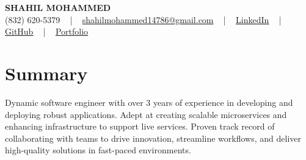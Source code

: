 \documentclass[letterpaper,10pt]{article}
\begin{document}
\begin{center}
    {\fontsize{14pt}{12pt}\selectfont \textbf{\MakeUppercase{Shahil Mohammed}}}\\ \vspace{2pt}
    \fontsize{10pt}{12pt}\selectfont (832) 620-5379 ~ | ~ \href{mailto:shahilmohammed14786@gmail.com}{shahilmohammed14786@gmail.com} ~ | ~  
    \href{https://www.linkedin.com/in/shahil-mohammed-9652931a1/}{\color{blue}\underline{LinkedIn}}  ~ | ~ 
    \href{https://github.com/freakbeast14}{\color{blue}\underline{GitHub}} ~ | ~ 
    \href{https://shahil-mohammed.netlify.app/}{\color{blue}\underline{Portfolio}}
    \vspace{-8pt}
\end{center}

\section{Summary}
\vspace{-2pt}\fontsize{8pt}{9pt}\selectfont
Dynamic software engineer with over 3 years of experience in developing and deploying robust applications. Adept at creating scalable microservices and enhancing infrastructure to support live services. Proven track record of collaborating with teams to drive innovation, streamline workflows, and deliver high-quality solutions in fast-paced environments. 

\vspace{-5pt}
 
\vspace{-2pt}
\end{document}
